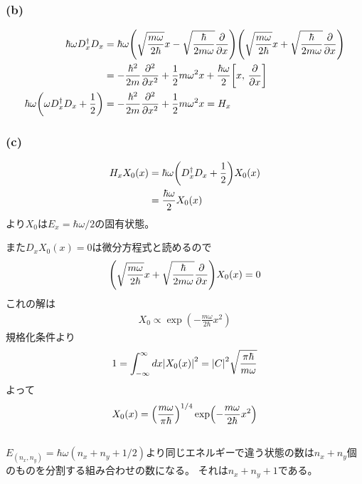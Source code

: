 \documentclass[../../master.tex]{subfiles}
\begin{document}
\subsubsection{(b)}
\begin{align}
    \hbar\omega D_x^\dagger D_x
    &= \hbar\omega\qty(
        \sqrt{\frac{m\omega}{2\hbar}}x-\sqrt{\frac{\hbar}{2m\omega}}\pdv{x}
    )\qty(
        \sqrt{\frac{m\omega}{2\hbar}}x+\sqrt{\frac{\hbar}{2m\omega}}\pdv{x}
    )\\
    &= -\frac{\hbar^2}{2m}\pdv[2]{x} + \frac{1}{2}m\omega^2 x
    + \frac{\hbar\omega}{2}\qty[x,\,\pdv{x}]\\
    \hbar\omega\qty(\omega D_x^\dagger D_x+\frac{1}{2})
    &= -\frac{\hbar^2}{2m}\pdv[2]{x} + \frac{1}{2}m\omega^2 x = H_x
\end{align}
\subsubsection{(c)}
\begin{align}
    H_xX_0(x) &= \hbar\omega\qty(D_x^\dagger D_x + \frac{1}{2})X_0(x)\\
    &= \frac{\hbar\omega}{2}X_0(x)
\end{align}
より\(X_0\)は\(E_x=\hbar\omega/2\)の固有状態。

また\(D_xX_0(x)=0\)は微分方程式と読めるので
\begin{align}
    \qty(
        \sqrt{\frac{m\omega}{2\hbar}}x+\sqrt{\frac{\hbar}{2m\omega}}\pdv{x}
    )X_0(x) = 0
\end{align}
これの解は
\begin{align}
    X_0 \propto \exp(-\frac{m\omega}{2\hbar}x^2)
\end{align}
規格化条件より
\begin{align}
    1 = \int_{-\infty}^{\infty}dx\abs{X_0(x)}^2 = \abs{C}^2 \sqrt{\frac{\pi\hbar}{m\omega}}
\end{align}
よって
\begin{align}
    X_0(x) = \qty(\frac{m\omega}{\pi\hbar})^{1/4}\exp(-\frac{m\omega}{2\hbar}x^2)
\end{align}
\subsection{}
\(E_{(n_x,n_y)}=\hbar\omega(n_x+n_y+1/2)\)より同じエネルギーで違う状態の数は\(n_x+n_y\)個のものを分割する組み合わせの数になる。
それは\(n_x+n_y+1\)である。
\end{document}
